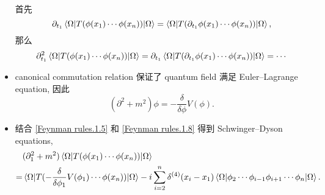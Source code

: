 \begin{itemize}
	\begin{tcolorbox}[title=proof:]
		首先
		\begin{equation}
			\partial_{t_1} \braket{\Omega | T(\phi(x_1) \cdots \phi(x_n)) | \Omega} = \braket{\Omega | T(\partial_{t_1} \phi(x_1) \cdots \phi(x_n)) | \Omega},
		\end{equation}
		那么
		\begin{equation}
			\partial_{t_1}^2 \braket{\Omega | T(\phi(x_1) \cdots \phi(x_n)) | \Omega} = \partial_{t_1} \braket{\Omega | T(\partial_{t_1} \phi(x_1) \cdots \phi(x_n)) | \Omega} = \cdots 
		\end{equation}
	\end{tcolorbox}
	
	\item canonical commutation relation 保证了 quantum field 满足 Euler--Lagrange equation, 因此
	\begin{equation} \label{Feynman rules.1.8}
		(\partial^2 + m^2) \phi = - \frac{\delta}{\delta \phi} V(\phi).
	\end{equation}
	
	\item 结合 \eqref{Feynman rules.1.5} 和 \eqref{Feynman rules.1.8} 得到 Schwinger--Dyson equations,
	\begin{align}
		& (\partial_1^2 + m^2) \braket{\Omega | T(\phi(x_1) \cdots \phi(x_n)) | \Omega} \notag \\
		=& \braket{\Omega | T(- \frac{\delta}{\delta \phi_1} V(\phi_1) \cdots \phi(x_n)) | \Omega} - i \sum_{i = 2}^n \delta^{(4)}(x_i - x_1) \braket{\Omega | \phi_2 \cdots \phi_{i - 1} \phi_{i + 1} \cdots \phi_n | \Omega}.
	\end{align}
\end{itemize}

